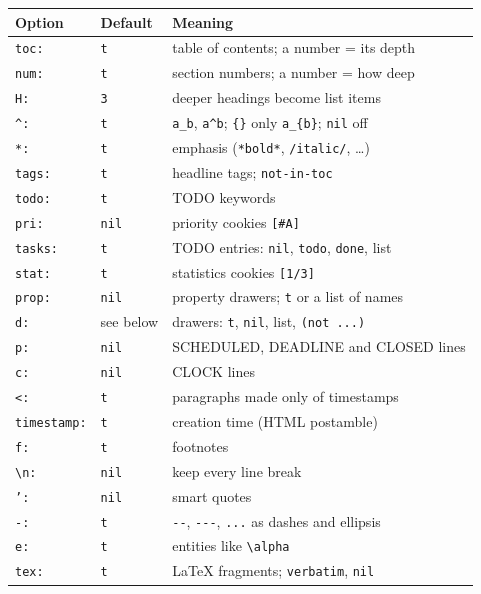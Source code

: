 \begin{center}
\begin{tabular}{lll}
Option & Default & Meaning\\
\hline
\texttt{toc:} & \texttt{t} & table of contents; a number = its depth\\
\texttt{num:} & \texttt{t} & section numbers; a number = how deep\\
\texttt{H:} & \texttt{3} & deeper headings become list items\\
\texttt{\textasciicircum{}:} & \texttt{t} & \texttt{a\_b}, \texttt{a\textasciicircum{}b}; \texttt{\{\}} only \texttt{a\_\{b\}}; \texttt{nil} off\\
\texttt{*:} & \texttt{t} & emphasis (\texttt{*bold*}, \texttt{/italic/}, \ldots{})\\
\texttt{tags:} & \texttt{t} & headline tags; \texttt{not-in-toc}\\
\texttt{todo:} & \texttt{t} & TODO keywords\\
\texttt{pri:} & \texttt{nil} & priority cookies \texttt{[\#A]}\\
\texttt{tasks:} & \texttt{t} & TODO entries: \texttt{nil}, \texttt{todo}, \texttt{done}, list\\
\texttt{stat:} & \texttt{t} & statistics cookies \texttt{[1/3]}\\
\texttt{prop:} & \texttt{nil} & property drawers; \texttt{t} or a list of names\\
\texttt{d:} & see below & drawers: \texttt{t}, \texttt{nil}, list, \texttt{(not ...)}\\
\texttt{p:} & \texttt{nil} & SCHEDULED, DEADLINE and CLOSED lines\\
\texttt{c:} & \texttt{nil} & CLOCK lines\\
\texttt{<:} & \texttt{t} & paragraphs made only of timestamps\\
\texttt{timestamp:} & \texttt{t} & creation time (HTML postamble)\\
\texttt{f:} & \texttt{t} & footnotes\\
\texttt{\textbackslash{}n:} & \texttt{nil} & keep every line break\\
\texttt{':} & \texttt{nil} & smart quotes\\
\texttt{-:} & \texttt{t} & \texttt{-{}-{}}, \texttt{-{}-{}-}, \texttt{...} as dashes and ellipsis\\
\texttt{e:} & \texttt{t} & entities like \texttt{\textbackslash{}alpha}\\
\texttt{tex:} & \texttt{t} & \LaTeX{} fragments; \texttt{verbatim}, \texttt{nil}\\

\end{tabular}
\end{center}
